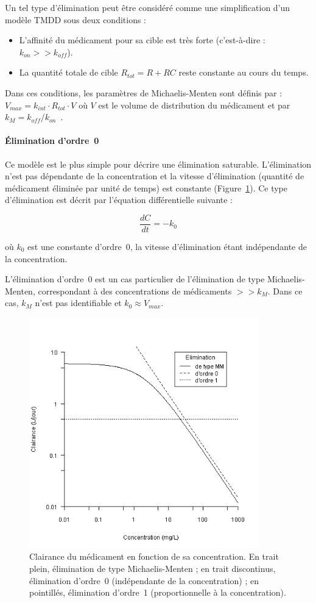 Un tel type d'élimination peut être considéré comme une simplification d'un modèle TMDD sous deux conditions :
\begin{itemize}
\item L'affinité du médicament pour sa cible est très forte (c'est-à-dire : $k_{on} >> k_{off}$).
\item La quantité totale de cible $R_{tot} =  R + RC$ reste constante au cours du temps.
\end{itemize}
Dans ces conditions, les paramètres de Michaelis-Menten sont définis par : $V_{max} = k_{int}\cdot R_{tot}\cdot V$ où $V$ est le volume de distribution du médicament et par $k_M = k_{off} /k_{on}$~\citep{REF4, REF6}.
\paragraph{Élimination d'ordre~0} Ce modèle est le plus simple pour décrire une élimination saturable. L'élimination n'est pas dépendante de la concentration et la vitesse d'élimination (quantité de médicament éliminée par unité de temps) est constante (Figure~\ref{fig:8}). Ce type d'élimination est décrit par l'équation différentielle suivante :

\begin{equation}
\frac{dC}{dt}=-k_0
\label{eq:35}
\end{equation}

où $k_0$ est une constante d'ordre~0, la vitesse d'élimination étant indépendante de la concentration.

L'élimination d'ordre~0 est un cas particulier de l'élimination de type Michaelis-Menten, correspondant à des concentrations de médicaments $>> k_M$. Dans ce cas, $k_M$ n'est pas identifiable et $k_0 \approx V_{max}$.

\begin{figure}[htbp]
	\centering
		\includegraphics[width=10cm]{figures/raster/FIG_8}
	\caption[Clairance du médicament en fonction de sa concentration.]{Clairance du médicament en fonction de sa concentration. En trait plein, élimination de type Michaelis-Menten ; en trait discontinus, élimination d'ordre~0 (indépendante de la concentration) ; en pointillés, élimination d'ordre~1 (proportionnelle à la concentration).}
	\label{fig:8}
\end{figure}

